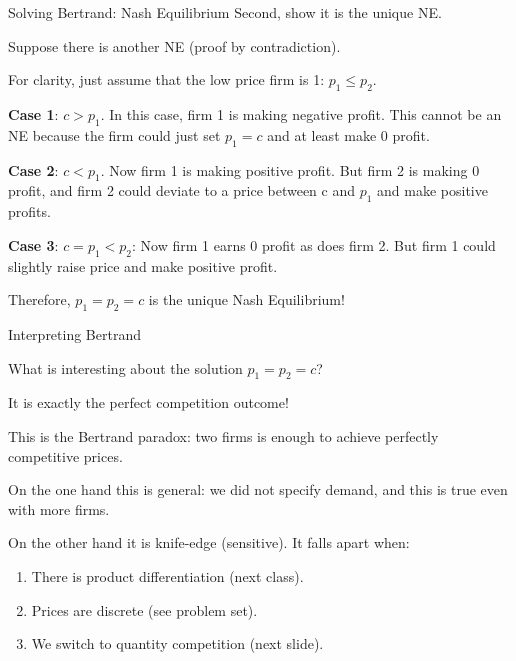 \documentclass[aspectratio=169]{beamer}
\newenvironment{wideitemize}{\itemize\addtolength{\itemsep}{10pt}}{\enditemize}
\begin{document}
\begin{frame}{Solving Bertrand: Nash Equilibrium}
Second, show it is the unique NE.
\begin{wideitemize}
    \item Suppose there is another NE (proof by contradiction).
    \item For clarity, just assume that the low price firm is 1: $p_1\leq p_2$.
    \item \textbf{Case 1}: $c>p_1$. In this case, firm 1 is making negative profit. This cannot be an NE because the firm could just set $p_1=c$ and at least make 0 profit.
    \item \textbf{Case 2}: $c<p_1$. Now firm 1 is making positive profit. But firm 2 is making 0 profit, and firm 2 could deviate to a price between c and $p_1$ and make positive profits.
    \item \textbf{Case 3}: $c=p_1<p_2$: Now firm 1 earns 0 profit as does firm 2. But firm 1 could slightly raise price and make positive profit.
    \item Therefore, $p_1=p_2=c$ is the unique Nash Equilibrium!
\end{wideitemize}
\end{frame}

\begin{frame}{Interpreting Bertrand}

\begin{wideitemize}
    \item What is interesting about the solution $p_1=p_2=c$?\pause
    \item It is exactly the perfect competition outcome!
    \item This is the Bertrand paradox: two firms is enough to achieve perfectly competitive prices.
    \item On the one hand this is general: we did not specify demand, and this is true even with more firms.
    \item On the other hand it is knife-edge (sensitive). It falls apart when:
    \begin{enumerate}
        \item There is product differentiation (next class).
        \item Prices are discrete (see problem set).
        \item We switch to quantity competition (next slide).
    \end{enumerate}
\end{wideitemize}
    
\end{frame}
\end{document}
